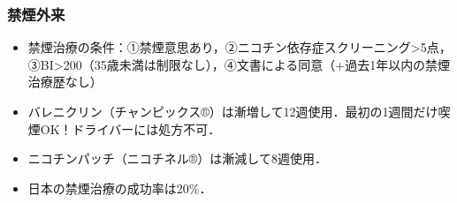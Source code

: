 \subsubsection{禁煙外来}

\begin{itemize}
\item 禁煙治療の条件：①禁煙意思あり，②ニコチン依存症スクリーニング>5点，③BI>200（35歳未満は制限なし），④文書による同意（+過去1年以内の禁煙治療歴なし）
\item バレニクリン（チャンピックス®）は漸増して12週使用．最初の1週間だけ喫煙OK！ドライバーには処方不可．
\item ニコチンパッチ（ニコチネル®）は漸減して8週使用．
\item 日本の禁煙治療の成功率は20\%．
\end{itemize}
